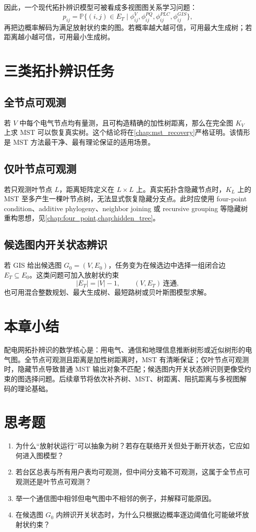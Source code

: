 因此，一个现代拓扑辨识模型可被看成多视图图关系学习问题：
\begin{equation}
  p_{ij} = \mathbb{P}\{(i,j)\in E_T \mid
  \phi^{V}_{ij},\phi^{PQ}_{ij},\phi^{PLC}_{ij},\phi^{GIS}_{ij}\},
\end{equation}
再把边概率解码为满足放射状约束的图。若概率越大越可信，可用最大生成树；若距离越小越可信，可用最小生成树。

\section{三类拓扑辨识任务}

\subsection{全节点可观测}
若 $V$ 中每个电气节点均有量测，且可构造精确的加性树距离，那么在完全图 $K_V$ 上求 MST 可以恢复真实树。这个结论将在\cref{chap:mst_recovery}严格证明。该情形是 MST 方法最干净、最有理论保证的适用场景。

\subsection{仅叶节点可观测}
若只观测叶节点 $L$，距离矩阵定义在 $L\times L$ 上。真实拓扑含隐藏节点时，$K_L$ 上的 MST 至多产生一棵叶节点树，无法显式恢复隐藏分支点。此时应使用 four-point condition、additive phylogeny、neighbor joining 或 recursive grouping 等隐藏树重构思想，见\cref{chap:four_point,chap:hidden_tree}。

\subsection{候选图内开关状态辨识}
若 GIS 给出候选图 $G_0=(V,E_0)$，任务变为在候选边中选择一组闭合边 $E_T\subseteq E_0$。这类问题可加入放射状约束
\begin{equation}
  |E_T|=|V|-1,\qquad (V,E_T)\ \text{连通},
\end{equation}
也可用混合整数规划、最大生成树、最短路树或贝叶斯图模型求解。

\section{本章小结}

配电网拓扑辨识的数学核心是：用电气、通信和地理信息推断树形或近似树形的电气图。全节点可观测且距离是加性树距离时，MST 有清晰保证；仅叶节点可观测时，隐藏节点导致普通 MST 输出对象不匹配；候选图内开关状态辨识则更像受约束的图选择问题。后续章节将依次补齐树、MST、树距离、阻抗距离与多视图解码的理论基础。

\section*{思考题}
\begin{enumerate}
  \item 为什么“放射状运行”可以抽象为树？若存在联络开关但处于断开状态，它应如何进入图模型？
  \item 若台区总表与所有用户表均可观测，但中间分支箱不可观测，这属于全节点可观测还是叶节点可观测？
  \item 举一个通信图中相邻但电气图中不相邻的例子，并解释可能原因。
  \item 在候选图 $G_0$ 内辨识开关状态时，为什么只根据边概率逐边阈值化可能破坏放射状约束？
\end{enumerate}

